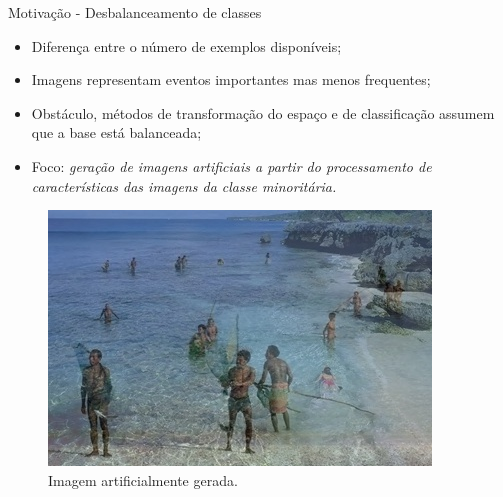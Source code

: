 \documentclass{beamer}
\begin{document}
\begin{frame}{Motivação - Desbalanceamento de classes}
\setlength\leftmargini{0em}
\justifying
  \begin{itemize}
    \item Diferença entre o número de exemplos disponíveis;
    \item Imagens representam eventos importantes mas menos frequentes;
    \item Obstáculo, métodos de transformação do espaço e de
    classificação assumem que a base está balanceada;
    \item Foco: \emph{geração de imagens artificiais a partir do processamento de características das imagens da classe minoritária.}
  \end{itemize}
  \begin{figure}[htbp]
 \begin{center}
   \includegraphics[width=.4\linewidth]{figuras/imagemgerada.jpg}
 \caption{Imagem artificialmente gerada.}
 \end{center}
\end{figure}

\end{frame}
\end{document}
